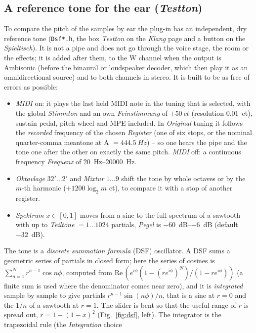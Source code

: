 \documentclass[11pt,a4paper,parskip=half,DIV=11,toc=bibliography]{scrartcl}
\newcommand{\ui}[1]{\emph{#1}}                 %
\newcommand{\fn}[1]{\mbox{\texttt{#1}}}
\begin{document}
\subsection{A reference tone for the ear (\ui{Testton})}
\label{sec:testton}
To compare the pitch of the samples by ear the plug-in has an independent, dry reference tone (\fn{Dsf*.h}, the box
\ui{Testton} on the \ui{Klang} page and a button on the \ui{Spieltisch}). It is not a pipe and does not go through the voice
stage, the room or the effects; it is added after them, to the W channel when the output is Ambisonic (before the binaural or loudspeaker decoder, which then
play it as an omnidirectional source) and to both channels in stereo. It is built to be as free of errors as possible:
\begin{itemize}
  \item \ui{MIDI} on: it plays the last held MIDI note in the tuning that is selected, with the global \ui{Stimmton} and an own
        \ui{Feinstimmung} of $\pm\SI{50}{ct}$ (resolution \SI{0.01}{ct}), sustain pedal, pitch wheel and MPE included. In
        \ui{Original} tuning it follows the \emph{recorded} frequency of the chosen \ui{Register} (one of six stops, or
        the nominal quarter-comma meantone at A $=\SI{444.5}{Hz}$) -- so one hears the pipe and the tone one after the other
        on exactly the same pitch. \ui{MIDI} off: a continuous frequency \ui{Frequenz} of \SIrange{20}{20000}{Hz}.
  \item \ui{Oktavlage} $32'\dots2'$ and \ui{Mixtur} $1\dots9$ shift the tone by whole octaves or by the $m$-th harmonic
        ($+1200\log_2 m$ ct), to compare it with a stop of another register.
  \item \ui{Spektrum} $x\in[0,1]$ moves from a sine to the full spectrum of a sawtooth with up to \ui{Teiltöne} $=1\dots1024$
        partials, \ui{Pegel} is \SIrange{-60}{-6}{dB} (default \SI{-32}{dB}).
\end{itemize}
The tone is a \emph{discrete summation formula} (DSF) oscillator. A DSF sums a geometric series of partials in closed form; here
the series of cosines is
$\sum_{n=1}^{N} r^{n-1}\cos n\phi$, computed from $\mathrm{Re}\,(e^{i\phi}(1-(re^{i\phi})^N)/(1-re^{i\phi}))$ (a finite sum is used
where the denominator comes near zero), and it is \emph{integrated} sample by sample to give partials
$r^{n-1}\sin(n\phi)/n$, that is a sine at $r=0$ and the $1/n$ of a sawtooth at $r=1$. The slider is bent so that the useful range of
$r$ is spread out, $r = 1-(1-x)^2$ (Fig.~\ref{fig:dsf}, left). The integrator is the trapezoidal rule (the \ui{Integration} choice
\end{document}
